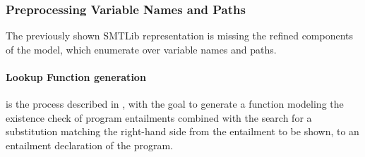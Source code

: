 \subsubsection{Preprocessing Variable Names and Paths}
The previously shown SMTLib representation is
missing the refined components of the model,
which enumerate over variable names and paths.

\paragraph{Lookup Function generation}
is the process described in ,
with the goal to generate a function modeling
the existence check of program entailments
combined with the search for a substitution
matching the right-hand side from the entailment
to be shown, to an entailment declaration of the program.


